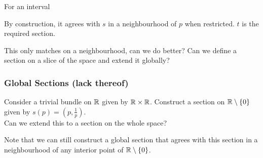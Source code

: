 \begin{frame}

    For an interval
    
    \begin{center}
    \end{center}

\end{frame}

\begin{frame}
    
    By construction, it agrees with \(s\) in a neighbourhood of \(p\) when
    restricted. \(t\) is the required section. \pause

    This only matches on a neighbourhood, can we do better? Can we define a
    section on a slice of the space and extend it globally?

\end{frame}

\begin{frame}
    \frametitle{Global Sections (lack thereof)}

    Consider a trivial bundle on \(\mathbb{R}\) given by \(\mathbb{R} \times \mathbb{R}\).
    Construct a section on \(\mathbb{R} \setminus \{0\}\) given by \(s(p) = (p,
    \frac{1}{p})\).\\

    Can we extend this to a section on the whole space? \\ \pause

    Note that we can still construct a global section that agrees with this
    section in a neighbourhood of any interior point of \(\mathbb{R} \setminus
    \{0\}\).

\end{frame}